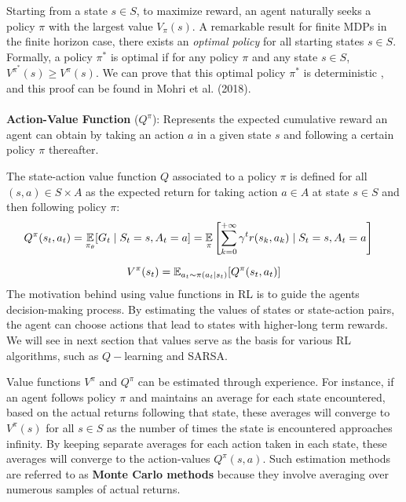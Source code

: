 Starting from a state $s \in S$, to maximize reward, an agent naturally seeks a policy $\pi$ with the largest value $V_{\pi}(s)$. A remarkable result for finite MDPs in the finite horizon case, there exists an \textit{optimal policy} for all starting states $s \in S$. Formally, a policy $\pi^*$ is optimal if for any policy $\pi$ and any state $s \in S$, $V^{\pi^*}(s) \geq  V^{\pi}(s)$. 
We can prove that this optimal policy $\pi^*$ is deterministic \cite{mohri2018}, and this proof can be found in Mohri  et al. (2018). 
\\\
\\
\textbf{Action-Value Function} ($Q^{\pi}$): Represents the expected cumulative reward an agent can obtain by taking an action $a$ in a given state $s$ and following a certain policy $\pi$ thereafter. 

\begin{definition}
    The state-action value function $Q$ associated to a policy $\pi$ is defined for all $(s,a) \in S \times A$ as the expected return for taking action $a \in A$ at state $s \in S$ and then following policy $\pi$:
    \begin{align*}
    Q^{\pi}(s_t,a_t) &=  \underset{\pi_{\theta}}{\mathbb E} [G_t \mid S_t =s, A_t = a]  = \underset{\pi}{\mathbb E}
    \left [
    \sum_{k =0}^{+ \infty} \gamma^t r(s_{k}, a_k) \mid S_t = s, A_t = a \right ]
    \end{align*}
\end{definition}
$$
V^{\pi}(s_t) = \mathbb E_{a_t \sim \pi(a_t \mid s_t)}[Q^{\pi}(s_t, a_t)]
$$
The motivation behind using value functions in RL is to guide the agents decision-making process. By estimating the values of states or state-action pairs, the agent can choose actions that lead to states with higher-long term rewards. We will see in next section that values serve as the basis for various RL algorithms, such as $Q-$learning and SARSA.

Value functions $V^{\pi}$ and $Q^{\pi}$ can be estimated through experience. For instance, if an agent follows policy $\pi$ and maintains an average for each state encountered, based on the actual returns following that state, these averages will converge to $V^{\pi}(s)$ for all $s \in S$ as the number of times the state is encountered approaches infinity.
By keeping separate averages for each action taken in each state, these averages will converge to the action-values $Q^{\pi}(s,a)$. Such estimation methods are referred to as \textbf{Monte Carlo methods} because they involve averaging over numerous samples of actual returns.

